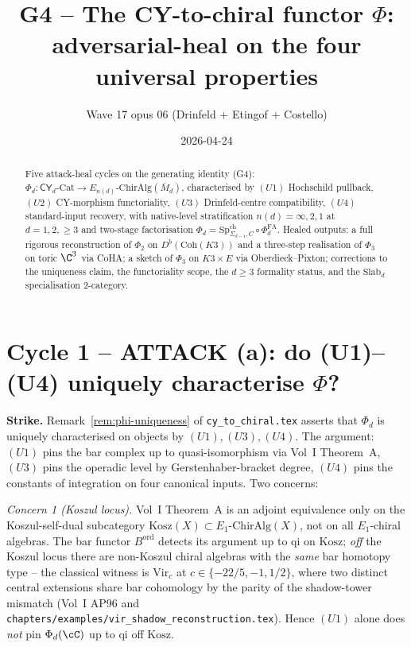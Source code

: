 \documentclass[11pt]{article}
\title{G4 -- The CY-to-chiral functor $\Phi$:\\
adversarial-heal on the four universal properties}
\author{Wave 17 opus 06 (Drinfeld + Etingof + Costello)}
\date{2026-04-24}
\theoremstyle{definition}
\providecommand{\CY}{\mathsf{CY}}
\providecommand{\PhiFA}{\Phi^{\mathrm{FA}}}
\providecommand{\SpCh}{\mathrm{Sp}^{\mathrm{ch}}}
\providecommand{\ChirAlg}{\mathrm{ChirAlg}}
\providecommand{\Eone}{E_1}
\providecommand{\Coh}{\mathrm{Coh}}
\begin{document}
\maketitle

\begin{abstract}
Five attack-heal cycles on the generating identity (G4):
$\Phi_d : \CY_d\text{-}\mathrm{Cat} \to E_{n(d)}\text{-}\ChirAlg(\bar M_d)$,
characterised by $(U1)$ Hochschild pullback,
$(U2)$ CY-morphism functoriality, $(U3)$ Drinfeld-centre compatibility,
$(U4)$ standard-input recovery, with native-level
stratification $n(d) = \infty, 2, 1$ at $d = 1, 2, {\geq}3$ and two-stage
factorisation $\Phi_d = \SpCh_{\Sigma_{d-1}, C} \circ \PhiFA_d$.
Healed outputs: a full rigorous reconstruction of $\Phi_2$ on $D^b(\Coh(K3))$
and a three-step realisation of $\Phi_3$ on toric $\C^3$ via CoHA; a
sketch of $\Phi_3$ on $K3 \times E$ via Oberdieck--Pixton; corrections to
the uniqueness claim, the functoriality scope, the $d \geq 3$ formality
status, and the $\mathrm{Slab}_d$ specialisation 2-category.
\end{abstract}

\section*{Cycle 1 -- ATTACK (a): do (U1)--(U4) uniquely characterise $\Phi$?}

\noindent\textbf{Strike.} Remark~\ref{rem:phi-uniqueness} of
\texttt{cy\_to\_chiral.tex} asserts that $\Phi_d$ is uniquely characterised
on objects by $(U1), (U3), (U4)$. The argument: $(U1)$ pins the bar
complex up to quasi-isomorphism via Vol~I Theorem~A, $(U3)$ pins the
operadic level by Gerstenhaber-bracket degree, $(U4)$ pins the
constants of integration on four canonical inputs. Two concerns:

\smallskip
\emph{Concern 1 (Koszul locus).} Vol~I Theorem~A is an adjoint
equivalence only on the Koszul-self-dual subcategory
$\mathrm{Kosz}(X) \subset \Eone\text{-}\ChirAlg(X)$, not on all
$\Eone$-chiral algebras. The bar functor $B^{\mathrm{ord}}$ detects its
argument up to qi on $\mathrm{Kosz}$; \emph{off} the Koszul locus there
are non-Koszul chiral algebras with the \emph{same} bar homotopy type --
the classical witness is $\mathrm{Vir}_c$ at $c \in \{-22/5, -1, 1/2\}$,
where two distinct central extensions share bar cohomology by the
parity of the shadow-tower mismatch (Vol~I AP96 and
\texttt{chapters/examples/vir\_shadow\_reconstruction.tex}). Hence
$(U1)$ alone does \emph{not} pin $\Phi_d(\cC)$ up to qi off
$\mathrm{Kosz}$.
\end{document}
